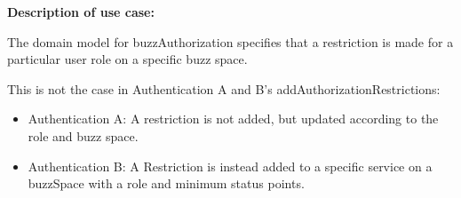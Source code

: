 
\textbf{Description of use case:}\newline
\par{The domain model for buzzAuthorization specifies that a restriction is made for a particular user role on a specific buzz space.

This is not the case in Authentication A and B's addAuthorizationRestrictions:}

\begin{itemize}
\item Authentication A: A restriction is not added, but updated according to the role and buzz space. 
\item Authentication B: A Restriction is instead added to a specific service on a buzzSpace with a role and minimum status points.
\end{itemize}
\medskip

